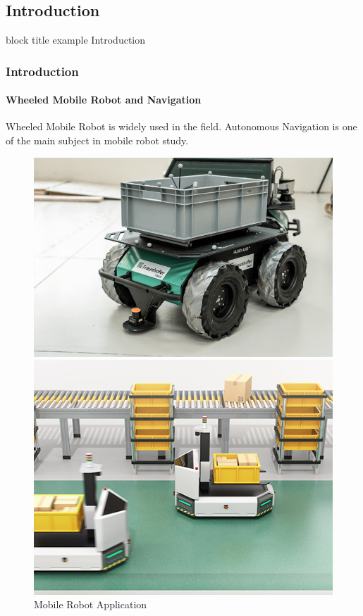 \begin{frame}
	\section{Introduction}
	\begin{beamercolorbox}[rounded=true]{block title example}
		\centering
		\LARGE
		Introduction
	\end{beamercolorbox}
\end{frame}

\begin{frame}
	\frametitle{Introduction}
	\framesubtitle{Wheeled Mobile Robot and Navigation}
	Wheeled Mobile Robot is widely used in the field. Autonomous Navigation is one of the main subject in mobile robot study.
	\begin{figure}
		\caption{Mobile Robot Application}
		\centering
		\begin{minipage}{0.3\linewidth}
			\centering
			\includegraphics[scale=0.14]{image/WMR_HuskyA200.png}\footnotemark
		\end{minipage}%
		\begin{minipage}{.3\linewidth}
			\centering
			\includegraphics[scale=0.8]{image/nidec}\footnotemark

\end{minipage}
\end{figure}
\end{frame}
